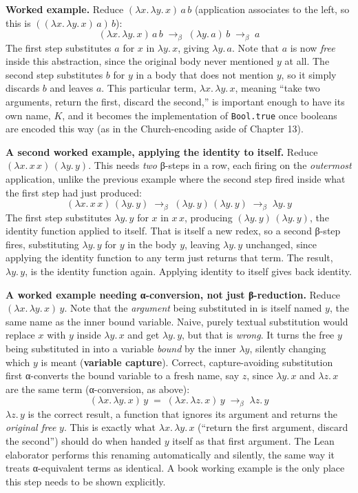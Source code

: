 \textbf{Worked example.} Reduce \((\lambda x.\, \lambda y.\, x)\, a\, b\) (application associates to the left, so this is \(((\lambda x.\, \lambda y.\, x)\, a)\, b\)): \[
(\lambda x.\, \lambda y.\, x)\, a\, b
\;\longrightarrow_\beta\; (\lambda y.\, a)\, b
\;\longrightarrow_\beta\; a
\] The first step substitutes \(a\) for \(x\) in \(\lambda y.\, x\), giving \(\lambda y.\, a\). Note that \(a\) is now \emph{free} inside this abstraction, since the original body never mentioned \(y\) at all. The second step substitutes \(b\) for \(y\) in a body that does not mention \(y\), so it simply discards \(b\) and leaves \(a\). This particular term, \(\lambda x.\, \lambda y.\, x\), meaning ``take two arguments, return the first, discard the second,'' is important enough to have its own name, \(K\), and it becomes the implementation of \texttt{Bool.true} once booleans are encoded this way (as in the Church-encoding aside of Chapter 13).

\textbf{A second worked example, applying the identity to itself.} Reduce \((\lambda x.\, x\, x)\, (\lambda y.\, y)\). This needs \emph{two} β-steps in a row, each firing on the \emph{outermost} application, unlike the previous example where the second step fired inside what the first step had just produced: \[
(\lambda x.\, x\, x)\, (\lambda y.\, y)
\;\longrightarrow_\beta\; (\lambda y.\, y)\, (\lambda y.\, y)
\;\longrightarrow_\beta\; \lambda y.\, y
\] The first step substitutes \(\lambda y.\, y\) for \(x\) in \(x\, x\), producing \((\lambda y.\, y)\, (\lambda y.\, y)\), the identity function applied to itself. That is itself a new redex, so a second β-step fires, substituting \(\lambda y.\, y\) for \(y\) in the body \(y\), leaving \(\lambda y.\, y\) unchanged, since applying the identity function to any term just returns that term. The result, \(\lambda y.\, y\), is the identity function again. Applying identity to itself gives back identity.

\textbf{A worked example needing α-conversion, not just β-reduction.} Reduce \((\lambda x.\, \lambda y.\, x)\, y\). Note that the \emph{argument} being substituted in is itself named \(y\), the same name as the inner bound variable. Naive, purely textual substitution would replace \(x\) with \(y\) inside \(\lambda y.\, x\) and get \(\lambda y.\, y\), but that is \emph{wrong}. It turns the free \(y\) being substituted in into a variable \emph{bound} by the inner \(\lambda y\), silently changing which \(y\) is meant (\textbf{variable capture}). Correct, capture-avoiding substitution first α-converts the bound variable to a fresh name, say \(z\), since \(\lambda y.\, x\) and \(\lambda z.\, x\) are the same term (α-conversion, as above): \[
(\lambda x.\, \lambda y.\, x)\, y
\;=\; (\lambda x.\, \lambda z.\, x)\, y
\;\longrightarrow_\beta\; \lambda z.\, y
\] \(\lambda z.\, y\) is the correct result, a function that ignores its argument and returns the \emph{original free} \(y\). This is exactly what \(\lambda x.\, \lambda y.\, x\) (``return the first argument, discard the second'') should do when handed \(y\) itself as that first argument. The Lean elaborator performs this renaming automatically and silently, the same way it treats α-equivalent terms as identical. A book working example is the only place this step needs to be shown explicitly.

